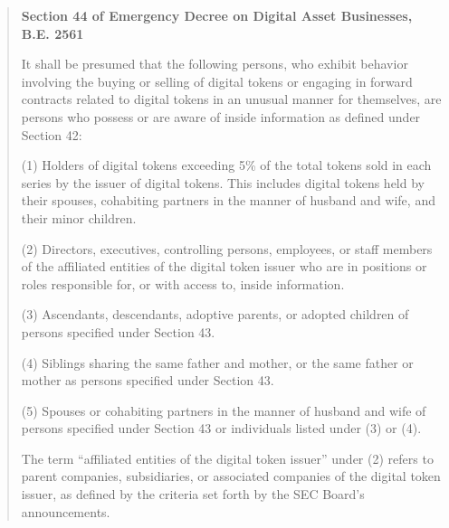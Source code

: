 \begin{quote}
    \textbf{Section 44 of Emergency Decree on Digital Asset Businesses, B.E. 2561}
    
    It shall be presumed that the following persons, who exhibit behavior involving the buying or selling of digital tokens or engaging in forward contracts related to digital tokens in an unusual manner for themselves, are persons who possess or are aware of inside information as defined under Section 42:
    
    (1) Holders of digital tokens exceeding 5\% of the total tokens sold in each series by the issuer of digital tokens. This includes digital tokens held by their spouses, cohabiting partners in the manner of husband and wife, and their minor children.
    
    (2) Directors, executives, controlling persons, employees, or staff members of the affiliated entities of the digital token issuer who are in positions or roles responsible for, or with access to, inside information.
    
    (3) Ascendants, descendants, adoptive parents, or adopted children of persons specified under Section 43.
    
    (4) Siblings sharing the same father and mother, or the same father or mother as persons specified under Section 43.
    
    (5) Spouses or cohabiting partners in the manner of husband and wife of persons specified under Section 43 or individuals listed under (3) or (4).
    
    The term \enquote{affiliated entities of the digital token issuer} under (2) refers to parent companies, subsidiaries, or associated companies of the digital token issuer, as defined by the criteria set forth by the SEC Board's announcements.
\end{quote}

